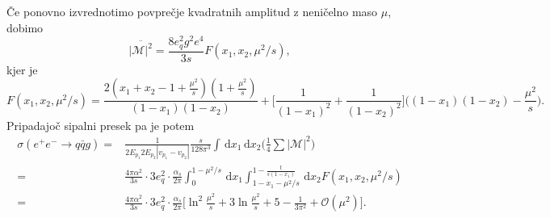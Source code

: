 \documentclass[11pt]{article}
\newcommand{\dd}{\,\mathrm{d}}
\newcommand{\ii}{\mathrm{i}}
\begin{document}
Če ponovno izvrednotimo povprečje kvadratnih amplitud z neničelno maso $\mu$,
dobimo
\begin{equation}
       \overline{ | \mathcal{M} |^2} = \frac{8 e_q^2 g^2 e^4}{3s} F(x_1, x_2, \mu^2/s),
\end{equation}
kjer je
\begin{equation}
       F(x_1, x_2, \mu^2/s) = \frac{2(x_1 + x_2 -1 + \frac{\mu^2}{s})(1+ \frac{\mu^2}{s})}
       {(1-x_1)(1-x_2)}
       + 
       \bigg[ \frac{1}{(1-x_1)^2} + \frac{1}{(1-x_2)^2}  \bigg ]
       \Big( (1-x_1)(1-x_2) - \frac{\mu^2}{s} \Big).
\end{equation}
Pripadajoč sipalni presek pa je potem
\begin{equation}
       \begin{split}
              \sigma(e^+ e^-  \rightarrow q \bar{q} g) =&
              \frac{1}{2E_{p_1} 2E_{p_2} |v_{p_1}- v_{p_2}|} \frac{s}{128 \pi^3} \int \dd x_1 \dd x_2
              \Big ( \frac{1}{4} \sum |\mathcal{M}|^2 \Big)
              \\ =&
              \frac{4 \pi \alpha^2}{3s} \cdot 3 e_q^2 \cdot \frac{\alpha_s}{2 \pi}
              \int_0^{1-\mu^2/s} \dd x_1 \int_{1-x_1 - \mu^2/s}^{1-\frac{t}{s(1-x_1)}} \dd x_2
              F(x_1, x_2, \mu^2/s)
              \\ =&
              \frac{4 \pi \alpha^2}{3s} \cdot 3 e_q^2 \cdot \frac{\alpha_s}{2 \pi}
              \Big[ \ln^2\frac{\mu^2}{s} + 3 \ln \frac{\mu^2}{s} + 5 - \frac{1}{3 \pi^2} + \mathcal{O}(\mu^2) \Big].
       \end{split}
\end{equation}


\end{document}

